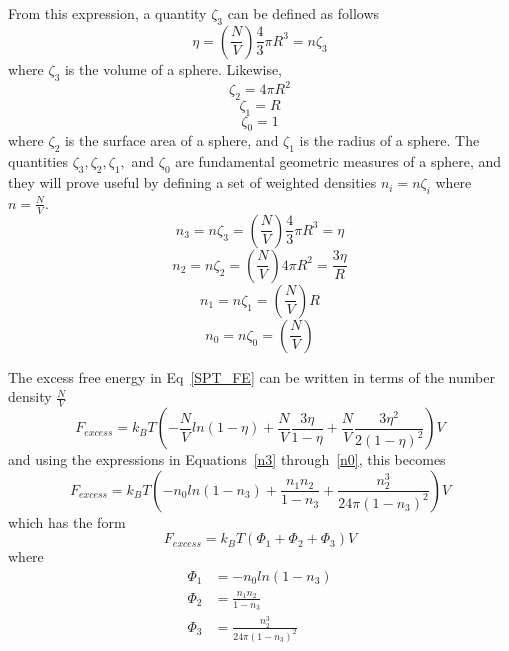 \documentclass[12pt]{article}
\begin{document}
From this expression, a quantity $\zeta_{3}$ can be defined as follows
\begin{equation}{\eta =\left(\frac{N}{V}\right)\frac{4}{3}\pi{R^3}=n\zeta_{3}}\end{equation}
where $\zeta_{3}$ is the volume of a sphere. Likewise,
\begin{equation}{\zeta_{2}=4\pi{R^2}}\end{equation}
\begin{equation}{\zeta_{1}=R}\end{equation}
\begin{equation}{\zeta_{0}=1}\end{equation}
where $\zeta_{2}$ is the surface area of a sphere, and $\zeta_{1}$ is the radius of a sphere. The quantities $\zeta_{3}, \zeta_{2}, \zeta_{1},$ and $\zeta_{0}$ are fundamental geometric measures of a sphere, and they will prove useful by defining a set of weighted densities $n_{i}=n\zeta_{i}$ where $n=\frac{N}{V}$. 
\begin{equation}\label{n3}{n_{3}=n\zeta_{3}=\left(\frac{N}{V}\right)\frac{4}{3}\pi{R^3}=\eta}\end{equation}
\begin{equation}\label{n2}{n_{2}=n\zeta_{2}=\left(\frac{N}{V}\right)4\pi{R^2}=\frac{3\eta}{R}}\end{equation}
\begin{equation}\label{n1}{n_{1}=n\zeta_{1}=\left(\frac{N}{V}\right)R}\end{equation}
\begin{equation}\label{n0}{n_{0}=n\zeta_{0}=\left(\frac{N}{V}\right)}\end{equation}

\noindent The excess free energy in Eq~\ref{SPT_FE} can be written in terms of the number density $\frac{N}{V}$
\begin{equation}{F_{excess}=k_{B}T\left(-\frac{N}{V}ln(1-\eta)+\frac{N}{V}\frac{3\eta}{1-\eta}+\frac{N}{V}\frac{3{\eta}^2}{2(1-\eta)^2}\right)V}\end{equation}
and using the expressions in Equations~\ref{n3} through~\ref{n0}, this becomes
\begin{equation}\label{FexfromSPT}{F_{excess}=k_{B}T\left(-n_{0}ln(1-n_{3})+\frac{n_{1}n_{2}}{1-n_{3}}+\frac{n_{2}^3}{24\pi(1-n_{3})^2}\right)V}\end{equation}
which has the form 
\begin{equation}{F_{excess} = k_BT(\Phi_1+\Phi_2+\Phi_3)V}\end{equation}
where 
\begin{align}
   \Phi_1 &= -n_{0}ln(1-n_{3}) \\
   \Phi_2 &= \frac{n_{1}n_{2}}{1-n_{3}} \\
   \Phi_3 &= \frac{n_{2}^3}{24\pi(1-n_{3})^2} 
\end{align}
\end{document}
